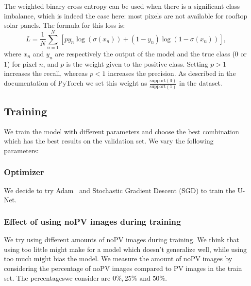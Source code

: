 \documentclass[10pt,conference]{IEEEtran}
\begin{document}
The weighted binary cross entropy can be used when there is a significant class imbalance, which is indeed the case here:
most pixels are not available for rooftop solar panels. 
The formula for this loss is:
\begin{equation*}
    L = \frac{1}{N} \sum_{n=1}^N  [py_n \log(\sigma(x_n))
        + (1-y_n) \log(1-\sigma(x_n))],
\end{equation*}
where $x_n$ and $y_n$ are respectively the output of the model and the true class (0 or 1) for pixel $n$,
and $p$ is the weight given to the positive class. 
Setting $p>1$ increases the recall, whereas $p<1$ increases the precision.
As described in the documentation of PyTorch we set this weight as
$\frac{\mathrm{support}(0)}{\mathrm{support}(1)}$
in the dataset.


\subsection{Training}
We train the model with different parameters and choose the best combination which has the best results on the validation set. We vary the following parameters:

\subsubsection{Optimizer}
We decide to try Adam~\cite{kingma2014adam} and Stochastic Gradient Descent (SGD) to train the U-Net.

\subsubsection{Effect of using noPV images during training}
We try using different amounts of noPV images during training. We think that using too little might make for a model which doesn't generalize well, while using too much might bias the model. We measure the amount of noPV images by considering the percentage of noPV images compared to PV images in the train set. The percentageswe consider are $0\%, 25\% \text{ and } 50\%$.
\end{document}

